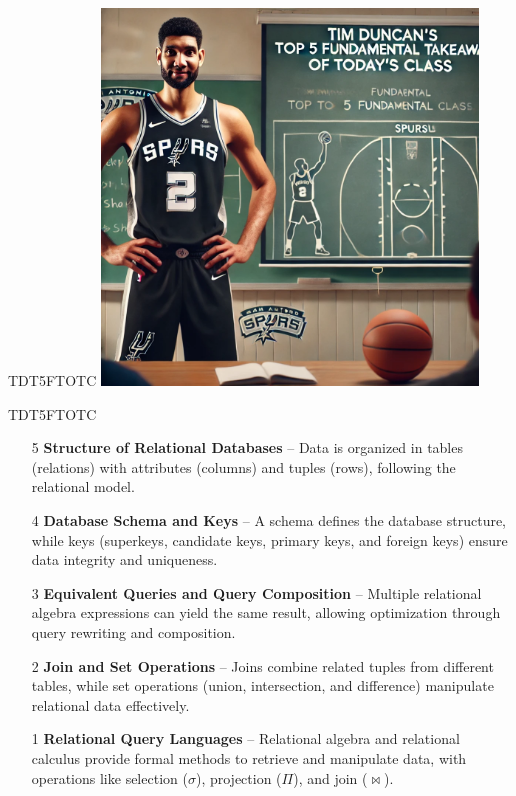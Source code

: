 \documentclass{beamer}
\begin{document}
\begin{frame}{TDT5FTOTC}
    \centering
    \includegraphics[width=0.75\textwidth]{figures/tim.png}
\end{frame}

\begin{frame}{TDT5FTOTC}
    \small
    \begin{enumerate} \pause
        \item[5] \textbf{Structure of Relational Databases} – Data is organized in tables (relations) with attributes (columns) and tuples (rows), following the relational model. \pause
        \item[4] \textbf{Database Schema and Keys} – A schema defines the database structure, while keys (superkeys, candidate keys, primary keys, and foreign keys) ensure data integrity and uniqueness.\pause
        \item[3] \textbf{Equivalent Queries and Query Composition} – Multiple relational algebra expressions can yield the same result, allowing optimization through query rewriting and composition.\pause
        \item[2] \textbf{Join and Set Operations} – Joins combine related tuples from different tables, while set operations (union, intersection, and difference) manipulate relational data effectively.\pause
        \item[1] \textbf{Relational Query Languages} – Relational algebra and relational calculus provide formal methods to retrieve and manipulate data, with operations like selection ($\sigma$), projection ($\Pi$), and join ($\Join$).\pause
    \end{enumerate}
\end{frame}
\end{document}
